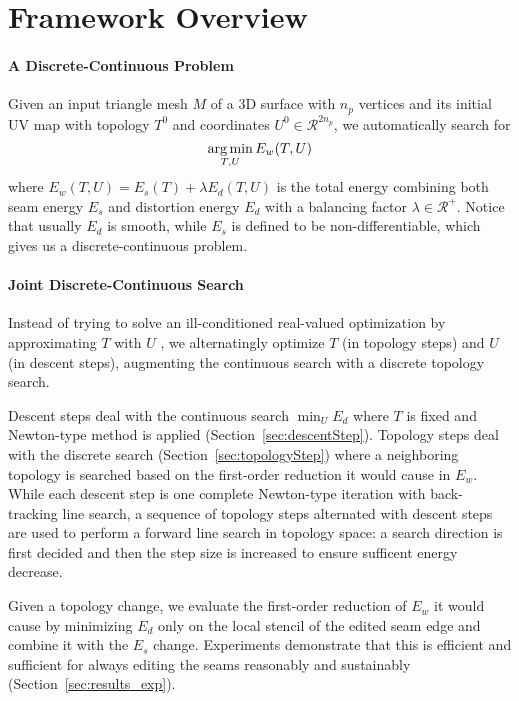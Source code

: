 
\section{Framework Overview}
\paragraph{A Discrete-Continuous Problem}

Given an input triangle mesh $M$ of a 3D surface with $n_p$ vertices and its initial UV map with topology $T^0$ and coordinates $U^0 \in \mathcal{R}^{2n_p}$, we automatically search for
\[ \operatorname*{arg\,min}_{T,U} E_w(T,U) \]
where $E_w(T,U) = E_s(T) + \lambda E_d(T,U)$ is the total energy combining both seam energy $E_s$ and distortion energy $E_d$ with a balancing factor $\lambda \in \mathcal{R^+}$. Notice that usually $E_d$ is smooth, while $E_s$ is defined to be non-differentiable, which gives us a discrete-continuous problem.

\paragraph{Joint Discrete-Continuous Search}

Instead of trying to solve an ill-conditioned real-valued optimization by approximating $T$ with $U$ \cite{Poranne2017Autocuts}, we alternatingly optimize $T$ (in topology steps) and $U$ (in descent steps), augmenting the continuous search with a discrete topology search.

Descent steps deal with the continuous search
$\min_U E_d$
where $T$ is fixed and Newton-type method is applied (Section~\ref{sec:descentStep}).
Topology steps deal with the discrete search (Section~\ref{sec:topologyStep}) where a neighboring topology is searched based on the first-order reduction it would cause in $E_w$.
While each descent step is one complete Newton-type iteration with back-tracking line search, a sequence of topology steps alternated with descent steps are used to perform a forward line search in topology space: a search direction is first decided and then the step size is increased to ensure sufficent energy decrease.

Given a topology change, we evaluate the first-order reduction of $E_w$ it would cause by minimizing $E_d$ only on the local stencil of the edited seam edge and combine it with the $E_s$ change. Experiments demonstrate that this is efficient and sufficient for always editing the seams reasonably and sustainably (Section~\ref{sec:results_exp}).

